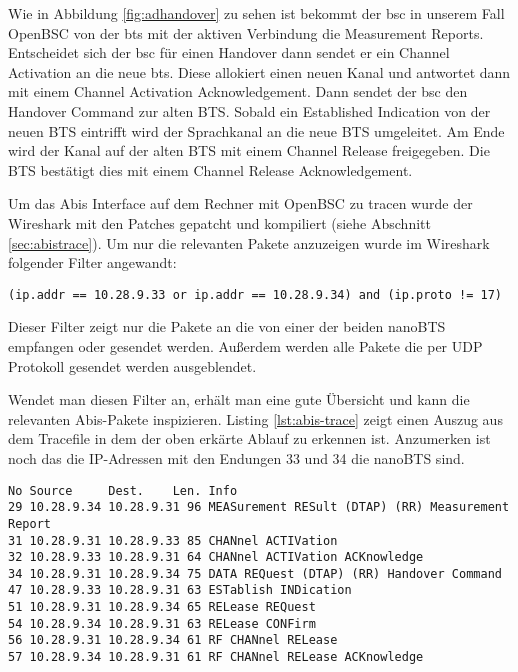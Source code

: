 Wie in Abbildung \ref{fig:adhandover} zu sehen ist bekommt der \gls{bsc} in unserem Fall OpenBSC von der \gls{bts} mit der aktiven Verbindung die Measurement Reports. Entscheidet sich der \gls{bsc} für einen Handover dann sendet er ein Channel Activation an die neue \gls{bts}. Diese allokiert einen neuen Kanal und antwortet dann mit einem Channel Activation Acknowledgement. Dann sendet der \gls{bsc} den Handover Command zur alten BTS. Sobald ein Established Indication von der neuen BTS eintrifft wird der Sprachkanal an die neue BTS umgeleitet. Am Ende wird der Kanal auf der alten BTS mit einem Channel Release freigegeben. Die BTS bestätigt dies mit einem Channel Release Acknowledgement.

Um das Abis Interface auf dem Rechner mit OpenBSC zu tracen wurde der Wireshark mit den Patches gepatcht und kompiliert (siehe Abschnitt \ref{sec:abistrace}). Um nur die relevanten Pakete anzuzeigen wurde im Wireshark folgender Filter angewandt:

\begin{lstlisting}[numbers=none]
(ip.addr == 10.28.9.33 or ip.addr == 10.28.9.34) and (ip.proto != 17)
\end{lstlisting}

Dieser Filter zeigt nur die Pakete an die von einer der beiden nanoBTS empfangen oder gesendet werden. Außerdem werden alle Pakete die per UDP Protokoll gesendet werden ausgeblendet.

Wendet man diesen Filter an, erhält man eine gute Übersicht und kann die relevanten Abis-Pakete inspizieren. Listing \ref{lst:abis-trace} zeigt einen Auszug aus dem Tracefile in dem der oben erkärte Ablauf zu erkennen ist. Anzumerken ist noch das die IP-Adressen mit den Endungen 33 und 34 die nanoBTS sind.

\begin{lstlisting}[label=lst:abis-trace,caption={Abis Trace mit Handover Nachrichten}]
No Source     Dest.    Len. Info
29 10.28.9.34 10.28.9.31 96	MEASurement RESult (DTAP) (RR) Measurement Report 
31 10.28.9.31 10.28.9.33 85	CHANnel ACTIVation 
32 10.28.9.33 10.28.9.31 64	CHANnel ACTIVation ACKnowledge 
34 10.28.9.31 10.28.9.34 75	DATA REQuest (DTAP) (RR) Handover Command 
47 10.28.9.33 10.28.9.31 63	ESTablish INDication 
51 10.28.9.31 10.28.9.34 65	RELease REQuest 
54 10.28.9.34 10.28.9.31 63	RELease CONFirm 
56 10.28.9.31 10.28.9.34 61	RF CHANnel RELease 
57 10.28.9.34 10.28.9.31 61 RF CHANnel RELease ACKnowledge 
\end{lstlisting}

